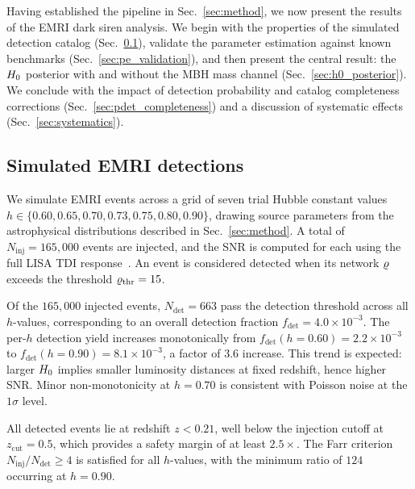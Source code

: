 
Having established the pipeline in Sec.~\ref{sec:method}, we now present
the results of the EMRI dark siren analysis. We begin with the properties
of the simulated detection catalog (Sec.~\ref{sec:detections}), validate
the parameter estimation against known benchmarks
(Sec.~\ref{sec:pe_validation}), and then present the central result:
the $H_0$ posterior with and without the MBH mass channel
(Sec.~\ref{sec:h0_posterior}). We conclude with the impact of
detection probability and catalog completeness corrections
(Sec.~\ref{sec:pdet_completeness}) and a discussion of systematic
effects (Sec.~\ref{sec:systematics}).

\subsection{Simulated EMRI detections}
\label{sec:detections}

We simulate EMRI events across a grid of seven trial Hubble constant
values $h \in \{0.60, 0.65, 0.70, 0.73, 0.75, 0.80, 0.90\}$, drawing
source parameters from the astrophysical distributions described in
Sec.~\ref{sec:method}. A total of $N_\mathrm{inj} = 165{,}000$ events
are injected, and the SNR is computed for each using the full LISA TDI
response~\cite{Babak:2023lro}. An event is considered detected when its
network $\varrho$ exceeds the threshold $\varrho_\mathrm{thr} = 15$.

Of the $165{,}000$ injected events, $N_\mathrm{det} = 663$ pass the
detection threshold across all $h$-values, corresponding to an overall
detection fraction $f_\mathrm{det} = 4.0 \times 10^{-3}$. The per-$h$
detection yield increases monotonically from
$f_\mathrm{det}(h=0.60) = 2.2 \times 10^{-3}$ to
$f_\mathrm{det}(h=0.90) = 8.1 \times 10^{-3}$, a factor of $3.6$
increase. This trend is expected: larger $H_0$ implies smaller luminosity
distances at fixed redshift, hence higher SNR. Minor non-monotonicity at
$h = 0.70$ is consistent with Poisson noise at the $1\sigma$ level.

All detected events lie at redshift $z < 0.21$, well below the injection
cutoff at $z_\mathrm{cut} = 0.5$, which provides a safety margin of at
least $2.5\times$. The Farr criterion~\cite{Farr:2019rap}
$N_\mathrm{inj}/N_\mathrm{det} \geq 4$ is satisfied for all $h$-values,
with the minimum ratio of $124$ occurring at $h = 0.90$.


